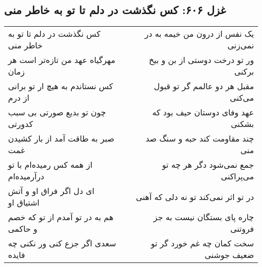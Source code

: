 \begin{center}
\section*{غزل ۶۰۶: کس نگذشت در دلم تا تو به خاطر منی}
\label{sec:606}
\begin{longtable}{l p{0.5cm} r}
کس نگذشت در دلم تا تو به خاطر منی
&&
یک نفس از درون من خیمه به در نمی‌زنی
\\
مهرگیاه عهد من تازه‌تر است هر زمان
&&
ور تو درخت دوستی از بن و بیخ برکنی
\\
کس نستاندم به هیچ ار تو برانی از درم
&&
مقبل هر دو عالمم گر تو قبول می‌کنی
\\
چون تو بدیع صورتی بی سبب کدورتی
&&
عهد وفای دوستان حیف بود که بشکنی
\\
صبر به طاقت آمد از بار کشیدن غمت
&&
چند مقاومت کند حبه و سنگ صد منی
\\
از همه کس رمیده‌ام با تو درآرمیده‌ام
&&
جمع نمی‌شود دگر هر چه تو می‌پراکنی
\\
ای دل اگر فراق او و آتش اشتیاق او
&&
در تو اثر نمی‌کند تو نه دلی که آهنی
\\
هم به در تو آمدم از تو که خصم و حاکمی
&&
چاره پای بستگان نیست به جز فروتنی
\\
سعدی اگر جزع کنی ور نکنی چه فایده
&&
سخت کمان چه غم خورد گر تو ضعیف جوشنی
\\
\end{longtable}
\end{center}
